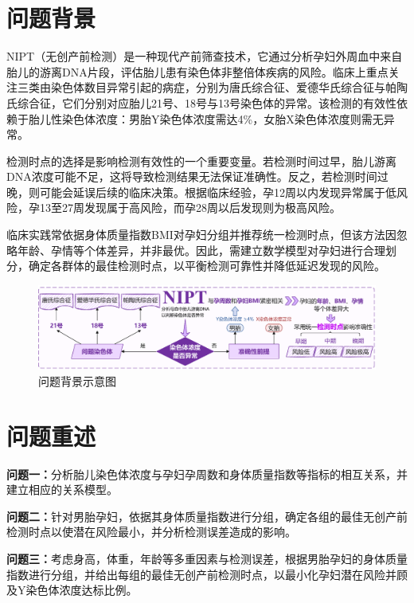 \section{问题背景}


NIPT（无创产前检测）是一种现代产前筛查技术，它通过分析孕妇外周血中来自胎儿的游离DNA片段，评估胎儿患有染色体非整倍体疾病的风险。临床上重点关注三类由染色体数目异常引起的病症，分别为唐氏综合征、爱德华氏综合征与帕陶氏综合征，它们分别对应胎儿21号、18号与13号染色体的异常。该检测的有效性依赖于胎儿性染色体浓度：男胎Y染色体浓度需达4\%，女胎X染色体浓度则需无异常。

检测时点的选择是影响检测有效性的一个重要变量。若检测时间过早，胎儿游离DNA浓度可能不足，这将导致检测结果无法保证准确性。反之，若检测时间过晚，则可能会延误后续的临床决策。根据临床经验，孕12周以内发现异常属于低风险，孕13至27周发现属于高风险，而孕28周以后发现则为极高风险。

临床实践常依据身体质量指数BMI对孕妇分组并推荐统一检测时点，但该方法因忽略年龄、孕情等个体差异，并非最优。因此，需建立数学模型对孕妇进行合理划分，确定各群体的最佳检测时点，以平衡检测可靠性并降低延迟发现的风险。


\begin{figure}[H]
	\centering
	\includegraphics[width=\textwidth]{figs/1前置/问题背景.pdf}
	\caption{问题背景示意图}
\end{figure}

\section{问题重述}

\textbf{问题一：}分析胎儿染色体浓度与孕妇孕周数和身体质量指数等指标的相互关系，并建立相应的关系模型。

\textbf{问题二：}针对男胎孕妇，依据其身体质量指数进行分组，确定各组的最佳无创产前检测时点以使潜在风险最小，并分析检测误差造成的影响。

\textbf{问题三：}考虑身高，体重，年龄等多重因素与检测误差，根据男胎孕妇的身体质量指数进行分组，并给出每组的最佳无创产前检测时点，以最小化孕妇潜在风险并顾及Y染色体浓度达标比例。

